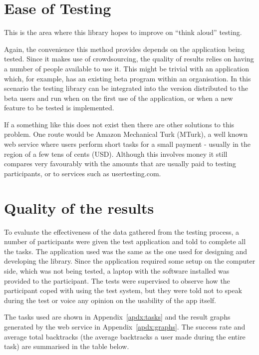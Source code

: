 \section{Ease of Testing}

This is the area where this library hopes to improve on ``think
aloud'' testing.

Again, the convenience this method provides depends on the application
being tested. Since it makes use of crowdsourcing, the quality of
results relies on having a number of people available to use it.
This might be trivial with an application which, for example, has
an existing beta program within an organisation. In this scenario
the testing library can be integrated into the version distributed
to the beta users and run when on the first use of the application,
or when a new feature to be tested is implemented.

If a something like this does not exist then there are other solutions
to this problem. One route would be Amazon Mechanical Turk (MTurk),
a well known web service where users perform short tasks for a small
payment - usually in the region of a few tens of cents (USD).
Although this involves money it still compares very favourably
with the amounts that are usually paid to testing participants, or
to services such as usertesting.com.

\section{Quality of the results}

To evaluate the effectiveness of the data gathered from the testing
process, a number of participants were given the test application
and told to complete all the tasks. The application used was the
same as the one used for designing and developing the library.
Since the application required some setup on the computer side,
which was not being tested, a laptop with the software installed
was provided to the participant. The tests were supervised to observe
how the participant coped with using the test system, but they were told
not to speak during the test or voice any opinion on the usability
of the app itself.

The tasks used are shown in Appendix~\ref{apdx:tasks} and the
result graphs generated by the web service in Appendix~\ref{apdx:graphs}. 
The success
rate and average total backtracks (the average backtracks a user
made during the entire task) are summarised in the table below.


